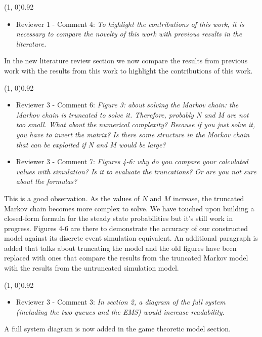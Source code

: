 \documentclass{article}
\begin{document}
    \line(1, 0){0.92\textwidth}
    \begin{itemize}
        \item Reviewer 1 - Comment 4: \textit{To highlight the contributions
        of this work, it is necessary to compare the novelty of this work
        with previous results in the literature.}
    \end{itemize}
    In the new literature review section we now compare the results from
    previous work with the results from this work to highlight the
    contributions of this work.

    \line(1, 0){0.92\textwidth}
    \begin{itemize}
        \item Reviewer 3 - Comment 6: \textit{Figure 3: about solving the
        Markov chain: the Markov chain is truncated to solve it. Therefore,
        probably N and M are not too small. What about the numerical
        complexity? Because if you just solve it, you have to invert the
        matrix? Is there some structure in the Markov chain that can be
        exploited if N and M would be large?}
        \item Reviewer 3 - Comment 7: \textit{Figures 4-6: why do you
        compare your calculated values with simulation?
        Is it to evaluate the truncations?
        Or are you not sure about the formulas?}
    \end{itemize}
    This is a good observation.
    As the values of \(N\) and \(M\) increase, the truncated Markov chain
    becomes more complex to solve.
    We have touched upon building a closed-form formula for the steady state
    probabilities but it's still work in progress.
    Figures 4-6 are there to demonstrate the accuracy of our constructed
    model against its discrete event simulation equivalent.
    An additional paragraph is added that talks about truncating the model
    and the old figures have been replaced with ones that compare the
    results from the truncated Markov model with the results from the
    untruncated simulation model.

    \line(1, 0){0.92\textwidth}
    \begin{itemize}
        \item Reviewer 3 - Comment 3: \textit{In section 2, a diagram
        of the full system (including the two queues and the EMS) would
        increase readability.}
    \end{itemize}
    A full system diagram is now added in the game theoretic model section.
\end{document}

